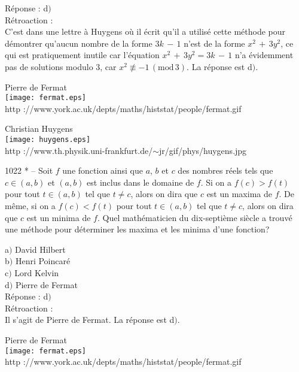 ﻿\documentclass[letterpaper, 12pt]{article}
\begin{document}
R\'eponse : d$)$\\

R\'etroaction : \\
C'est dans une lettre \`a Huygens o\`u il \'ecrit qu'il a utilis\'e
cette m\'ethode pour d\'emontrer qu'aucun nombre de la forme
$3k\,-\,1$ n'est de la forme $x^2\,+\,3y^2$, ce qui est pratiquement
inutile car l'\'equation $x^2\,+\,3y^2=3k\,-\,1$ n'a \'evidemment
pas de solutions modulo $3$, car $x^2\not
\equiv-1\,(\mathrm{mod}\,3)$.
La r\'eponse est d$)$.\\

        \begin{center}
        Pierre de Fermat\\
    \texttt{[image: fermat.eps]}\\
        {\footnotesize http
://www.york.ac.uk/depts/maths/histstat/people/fermat.gif}
    \end{center}

        \begin{center}
        Christian Huygens\\
    \texttt{[image: huygens.eps]}\\
        {\footnotesize http
://www.th.physik.uni-frankfurt.de/$\sim$jr/gif/phys/huygens.jpg}
    \end{center}

1022 * -- Soit $f$ une fonction ainsi que $a$, $b$ et $c$ des
nombres r\'eels tels que $c\in(a,b)$ et $(a,b)$ est inclus dans le
domaine de $f$. Si on a $f(c)>f(t)$ pour tout $t\in(a,b)$ tel que
$t\not=c$, alors on dira que $c$ est un maxima de $f$. De m\^eme, si
on a $f(c)<f(t)$ pour tout $t\in(a,b)$ tel que $t\not=c$, alors on
dira que $c$ est un minima de $f$. Quel math\'ematicien du
dix-septi\`eme si\`ecle a trouv\'e une m\'ethode pour d\'eterminer
les maxima et les minima d'une fonction?

a$)$ David Hilbert \\
b$)$ Henri Poincar\'e \\
c$)$ Lord Kelvin \\
d$)$ Pierre de Fermat \\

R\'eponse : d$)$\\

R\'etroaction : \\
Il s'agit de Pierre de Fermat.
La r\'eponse est d$)$.\\

        \begin{center}
        Pierre de Fermat\\
    \texttt{[image: fermat.eps]}\\
        {\footnotesize http
://www.york.ac.uk/depts/maths/histstat/people/fermat.gif}
    \end{center}
\end{document}
